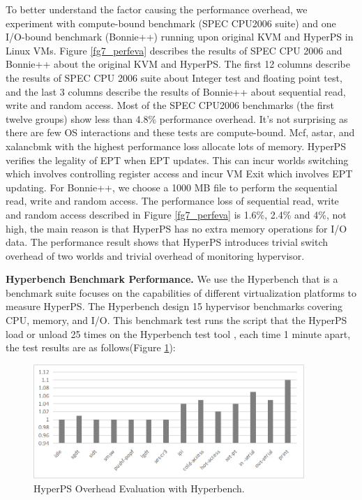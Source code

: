 \documentclass[10pt, numbers, preprint ]{sigplanconf}
\begin{document}
{To better understand the factor causing the performance overhead, we experiment with compute-bound benchmark (SPEC CPU2006 suite) and one I/O-bound benchmark (Bonnie++) running upon original KVM and HyperPS in Linux VMs. Figure \ref{fg7_perfeva} describes the results of SPEC CPU 2006 and Bonnie++ about the original KVM and HyperPS. The first 12 columns describe the results of SPEC CPU 2006 suite about Integer test and floating point test, and the last 3 columns describe the results of Bonnie++ about sequential read, write and random access. Most of the SPEC CPU2006 benchmarks (the first twelve groups) show less than 4.8\% performance overhead. It’s not surprising as there are few OS interactions and these tests are compute-bound. Mcf, astar, and xalancbmk with the highest performance loss allocate lots of memory. HyperPS verifies the legality of EPT when EPT updates. This can incur worlds switching which involves controlling register access and incur VM Exit which involves EPT updating. For Bonnie++, we choose a 1000 MB file to perform the sequential read, write and random access. The performance loss of sequential read, write and random access described in Figure \ref{fg7_perfeva} is 1.6\%, 2.4\% and 4\%, not high, the main reason is that HyperPS has no extra memory operations for I/O data. The performance result shows that HyperPS introduces trivial switch overhead of two worlds and trivial overhead of monitoring hypervisor.

\textbf{Hyperbench Benchmark Performance.} We use the Hyperbench that is a benchmark suite focuses on the capabilities of different virtualization platforms to measure HyperPS\cite{DBLP:journals/pomacs/WeiZT19}. The Hyperbench design 15 hypervisor benchmarks covering CPU, memory, and I/O. This benchmark test runs the script that the HyperPS load or unload 25 times on the Hyperbench test tool , each time 1 minute apart, the test results are as follows(Figure \ref{fg8_perftest_hb}):

\begin{figure}[htb]
	\centerline{\includegraphics[height=1.70in]{figures/p8.png}}
	\caption{HyperPS Overhead Evaluation with Hyperbench.}
	\label{fg8_perftest_hb}
\end{figure}

}
\end{document}
